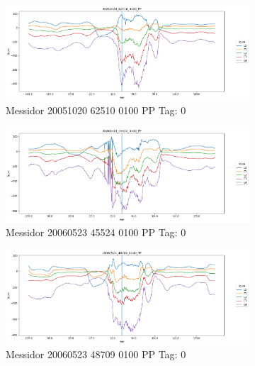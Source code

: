 \begin{figure}[ht!]
	\centering
	\begin{subfigure}[b]{ 0.85\textwidth}
		\centering
		\includegraphics[width=\textwidth]{Figures/chapter_stability/20051020_62510_0100_PP/h/scores.png}
		\caption{Messidor 20051020 62510 0100 PP Tag: 0}
	\end{subfigure}
	\begin{subfigure}[b]{ 0.85\textwidth}
		\centering
		\includegraphics[width=\textwidth]{Figures/chapter_stability/20060523_45524_0100_PP/h/scores.png}
		\caption{Messidor 20060523 45524 0100 PP Tag: 0}		
	\end{subfigure}	
	\begin{subfigure}[b]{ 0.85\textwidth}
		\centering
		\includegraphics[width=\textwidth]{Figures/chapter_stability/20060523_48709_0100_PP/h/scores.png}
		\caption{Messidor 20060523 48709 0100 PP Tag: 0}		
	\end{subfigure}
	\begin{subfigure}[b]{ 0.85\textwidth}

\end{subfigure}
\end{figure}
